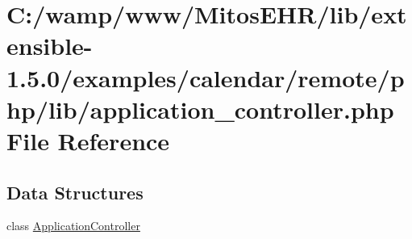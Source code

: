 \hypertarget{application__controller_8php}{\section{\-C\-:/wamp/www/\-Mitos\-E\-H\-R/lib/extensible-\/1.5.0/examples/calendar/remote/php/lib/application\-\_\-controller.php \-File \-Reference}
\label{application__controller_8php}
}
\subsection*{\-Data \-Structures}
\begin{DoxyCompactItemize}
\item 
class \hyperlink{class_application_controller}{\-Application\-Controller}
\end{DoxyCompactItemize}
